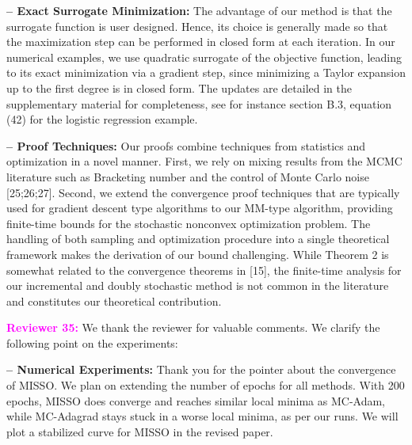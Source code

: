 \documentclass{article}
\begin{document}
\vspace{0.03in}
\textbf{-- Exact Surrogate Minimization:} 
The advantage of our method is that the surrogate function is user designed.
Hence, its choice is generally made so that the maximization step can be performed in closed form at each iteration.
In our numerical examples, we use quadratic surrogate of the objective function, leading to its exact minimization via a gradient step, since minimizing a Taylor expansion up to the first degree is in closed form.
The updates are detailed in the supplementary material for completeness, see for instance section B.3, equation (42) for the logistic regression example.

\vspace{0.03in}
\textbf{-- Proof Techniques:} 
Our proofs combine techniques from statistics and optimization in a novel manner. First, we rely on mixing results from the MCMC literature such as Bracketing number and the control of Monte Carlo noise [25;26;27]. Second, we extend the convergence proof techniques that are typically used for gradient descent type algorithms to our MM-type algorithm, providing finite-time bounds for the stochastic nonconvex optimization problem. The handling of both sampling and optimization procedure into a single theoretical framework makes the derivation of our bound challenging. While Theorem 2 is somewhat related to the convergence theorems in [15], the finite-time analysis for our incremental and doubly stochastic method is not common in the literature and constitutes our theoretical contribution.

\medskip
\textbf{\textcolor{magenta}{Reviewer 35:}} We thank the reviewer for valuable comments. We clarify the following point on the experiments: 

\vspace{0.03in}
\textbf{-- Numerical Experiments:} 
Thank you for the pointer about the convergence of MISSO.
We plan on extending the number of epochs for all methods.
With 200 epochs, MISSO does converge and reaches similar local minima as MC-Adam, while MC-Adagrad stays stuck in a worse local minima, as per our runs.
We will plot a stabilized curve for MISSO in the revised paper.
\end{document}
